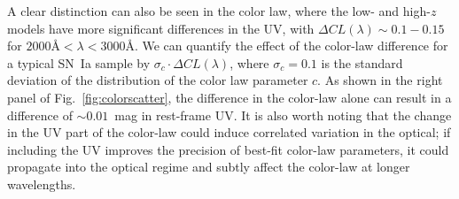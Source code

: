 \documentclass[twocolumn,tighten,times,floatfix]{aastex631}
\begin{document}
A clear distinction can also be seen in the color law, where the low- and high-$z$ models have more significant differences in the UV, with $\Delta CL(\lambda)\sim 0.1-0.15$ for $2000\text{\AA} <\lambda<3000\text{\AA}$. We can quantify the effect of the color-law difference for a typical SN~Ia sample by $\sigma_c\cdot \Delta CL(\lambda)$, where $\sigma_c = 0.1$ is the standard deviation of the distribution of the color law parameter $c$. As shown in the right panel of Fig.~\ref{fig:colorscatter}, the difference in the color-law alone can result in a difference of $\sim 0.01$~mag in rest-frame UV. It is also worth noting that the change in the UV part of the color-law could induce correlated variation in the optical; if including the UV improves the precision of best-fit color-law parameters, it could propagate into the optical regime and subtly affect the color-law at longer wavelengths.  
\end{document}
